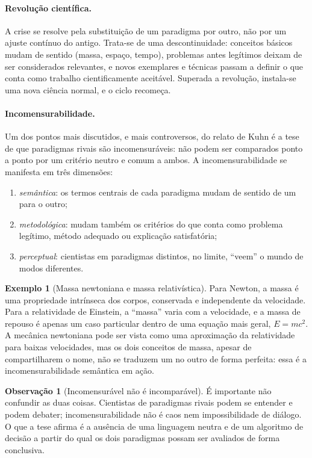 \documentclass[9pt,a4paper]{extarticle}
\newcommand{\impt}[1]{\textcolor{important}{#1}}
\theoremstyle{definition}
\newtheorem{example}{Exemplo}[section]
\newtheorem{remark}{Observação}[section]
\begin{document}
\paragraph{Revolução científica.}
A crise se resolve pela \impt{substituição} de um paradigma por outro, não por um ajuste contínuo do antigo. Trata-se de uma descontinuidade: conceitos básicos mudam de sentido (massa, espaço, tempo), problemas antes legítimos deixam de ser considerados relevantes, e novos exemplares e técnicas passam a definir o que conta como trabalho cientificamente aceitável. Superada a revolução, instala-se uma nova ciência normal, e o ciclo recomeça.

\paragraph{Incomensurabilidade.}
Um dos pontos mais discutidos, e mais controversos, do relato de Kuhn é a tese de que paradigmas rivais são \impt{incomensuráveis}: não podem ser comparados ponto a ponto por um critério neutro e comum a ambos. A incomensurabilidade se manifesta em três dimensões:
\begin{enumerate}[label=(\roman*)]
  \item \emph{semântica}: os termos centrais de cada paradigma mudam de sentido de um para o outro;
  \item \emph{metodológica}: mudam também os critérios do que conta como problema legítimo, método adequado ou explicação satisfatória;
  \item \emph{perceptual}: cientistas em paradigmas distintos, no limite, \enquote{veem} o mundo de modos diferentes.
\end{enumerate}

\begin{example}[Massa newtoniana e massa relativística]
Para Newton, a massa é uma propriedade intrínseca dos corpos, conservada e independente da velocidade. Para a relatividade de Einstein, a \enquote{massa} varia com a velocidade, e a massa de repouso é apenas um caso particular dentro de uma equação mais geral, $E = mc^2$. A mecânica newtoniana pode ser vista como uma aproximação da relatividade para baixas velocidades, mas os dois conceitos de massa, apesar de compartilharem o nome, não se traduzem um no outro de forma perfeita: essa é a incomensurabilidade semântica em ação.
\end{example}

\begin{remark}[Incomensurável não é incomparável]
É importante não confundir as duas coisas. Cientistas de paradigmas rivais podem se entender e podem debater; incomensurabilidade não é caos nem impossibilidade de diálogo. O que a tese afirma é a ausência de uma linguagem neutra e de um algoritmo de decisão a partir do qual os dois paradigmas possam ser avaliados de forma conclusiva.
\end{remark}
\end{document}
